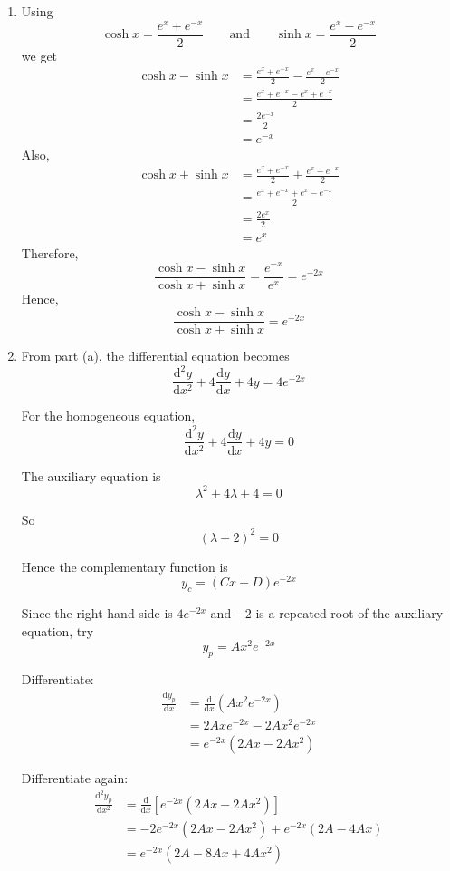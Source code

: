 \documentclass[leqno]{article}
\begin{document}
\begin{enumerate}[
  label=\textbf{\arabic*.},
  leftmargin=*,
  topsep=0pt,
  partopsep=0pt,
  parsep=0pt
]
\begin{tcolorbox}[colback=white, colframe=scarlet, title={\textbf{Solution}}, breakable, grow to left by=6mm, grow to right by=10mm]
\begin{enumerate}[label=\textbf{(\alph*)}]
  \item Using
\[
\cosh x=\frac{e^x+e^{-x}}{2}
\qquad \text{and} \qquad
\sinh x=\frac{e^x-e^{-x}}{2}
\]
we get
\begin{align*}
\cosh x-\sinh x
&= \frac{e^x+e^{-x}}{2}-\frac{e^x-e^{-x}}{2} \\
&= \frac{e^x+e^{-x}-e^x+e^{-x}}{2} \\
&= \frac{2e^{-x}}{2} \\
&= e^{-x}
\end{align*}
Also,
\begin{align*}
\cosh x+\sinh x
&= \frac{e^x+e^{-x}}{2}+\frac{e^x-e^{-x}}{2} \\
&= \frac{e^x+e^{-x}+e^x-e^{-x}}{2} \\
&= \frac{2e^x}{2} \\
&= e^x
\end{align*}
Therefore,
\[
\frac{\cosh x-\sinh x}{\cosh x+\sinh x}
= \frac{e^{-x}}{e^x}
= e^{-2x}
\]
Hence,
\[
\frac{\cosh x-\sinh x}{\cosh x+\sinh x}=e^{-2x}
\]

\item From part (a), the differential equation becomes
\[
\frac{\mathrm{d}^2 y}{\mathrm{d}x^2}+4\frac{\mathrm{d}y}{\mathrm{d}x}+4y=4e^{-2x}
\]

For the homogeneous equation,
\[
\frac{\mathrm{d}^2 y}{\mathrm{d}x^2}+4\frac{\mathrm{d}y}{\mathrm{d}x}+4y=0
\]

The auxiliary equation is
\[
\lambda^2+4\lambda+4=0
\]

So
\[
(\lambda+2)^2=0
\]

Hence the complementary function is
\[
y_c=(Cx+D)e^{-2x}
\]

Since the right-hand side is $4e^{-2x}$ and $-2$ is a repeated root of the auxiliary equation, try
\[
y_p=Ax^2e^{-2x}
\]

Differentiate:
\begin{align*}
\frac{\mathrm{d}y_p}{\mathrm{d}x}
&= \frac{\mathrm{d}}{\mathrm{d}x}\left(Ax^2e^{-2x}\right) \\
&= 2Axe^{-2x}-2Ax^2e^{-2x} \\
&= e^{-2x}(2Ax-2Ax^2)
\end{align*}

Differentiate again:
\begin{align*}
\frac{\mathrm{d}^2y_p}{\mathrm{d}x^2}
&= \frac{\mathrm{d}}{\mathrm{d}x}\left[e^{-2x}(2Ax-2Ax^2)\right] \\
&= -2e^{-2x}(2Ax-2Ax^2)+e^{-2x}(2A-4Ax) \\
&= e^{-2x}(2A-8Ax+4Ax^2)
\end{align*}


\end{enumerate}
\end{tcolorbox}
\end{enumerate}
\end{document}
